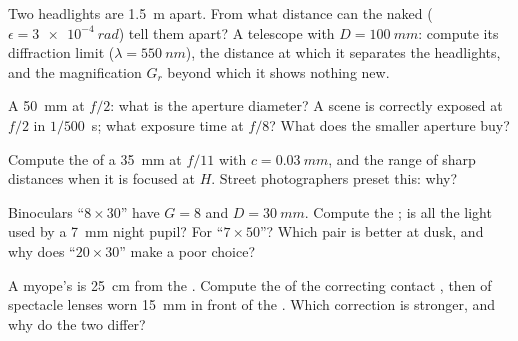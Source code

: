 \begin{exercise}[$\star\star$]\label{exo:b1:optical-instruments:6}
Two headlights are \qty{1.5}{m} apart. From what distance can the
naked  ($\epsilon = \qty{3e-4}{rad}$) tell them apart? A telescope
with $D = \qty{100}{mm}$: compute its diffraction limit ($\lambda =
\qty{550}{nm}$), the distance at which it separates the headlights, and
the magnification $G_r$ beyond which it shows nothing new.
\end{exercise}

\begin{exercise}[$\star\star$]\label{exo:b1:optical-instruments:7}
A \qty{50}{mm}  at $f/2$: what is the aperture diameter? A scene is
correctly exposed at $f/2$ in $1/500$~\unit{s}; what exposure time at
$f/8$? What does the smaller aperture buy?
\end{exercise}

\begin{exercise}[$\star\star$]\label{exo:b1:optical-instruments:8}
Compute the  of a \qty{35}{mm}  at $f/11$ with
$c = \qty{0.03}{mm}$, and the range of sharp distances when it is
focused at $H$. Street photographers preset this: why?
\end{exercise}

\begin{exercise}[$\star\star$]\label{exo:b1:optical-instruments:9}
Binoculars ``$8\times30$'' have $G = 8$ and $D = \qty{30}{mm}$. Compute
the ; is all the light used by a \qty{7}{mm} night pupil? For
``$7\times50$''? Which pair is better at dusk, and why does ``$20\times30$''
make a poor choice?
\end{exercise}

\begin{exercise}[$\star\star\star$]\label{exo:b1:optical-instruments:10}
A myope's  is \qty{25}{cm} from the . Compute the 
of the correcting contact , then of spectacle lenses worn
\qty{15}{mm} in front of the . Which correction is stronger, and why
do the two differ?
\end{exercise}

